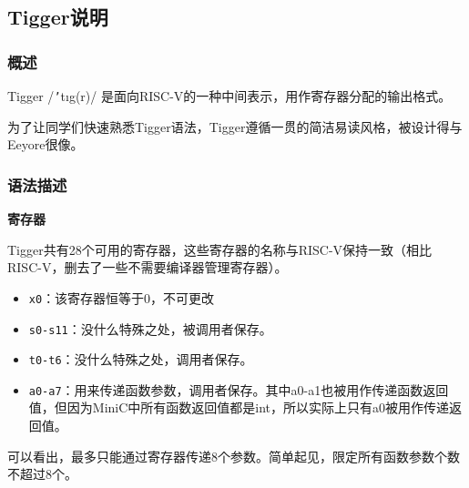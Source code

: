 \subsection{Tigger说明}
\subsubsection{概述}
Tigger /\texttt{'}t\i g\textschwa (r)/ 是面向RISC-V的一种中间表示，用作寄存器分配的输出格式。

为了让同学们快速熟悉Tigger语法，Tigger遵循一贯的简洁易读风格，被设计得与Eeyore很像。



\subsubsection{语法描述}

\noindent \textbf{寄存器}

Tigger共有28个可用的寄存器，这些寄存器的名称与RISC-V保持一致（相比RISC-V，删去了一些不需要编译器管理寄存器）。
\begin{itemize}
\item
\texttt{x0}：该寄存器恒等于0，不可更改

\item
\texttt{s0-s11}：没什么特殊之处，被调用者保存。

\item
\texttt{t0-t6}：没什么特殊之处，调用者保存。

\item
\texttt{a0-a7}：用来传递函数参数，调用者保存。其中a0-a1也被用作传递函数返回值，但因为MiniC中所有函数返回值都是int，所以实际上只有a0被用作传递返回值。
\end{itemize}
可以看出，最多只能通过寄存器传递8个参数。简单起见，限定所有函数参数个数不超过8个。

